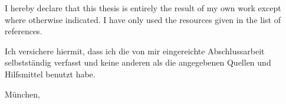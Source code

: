 I hereby declare that this thesis is entirely the result of my own work except where otherwise indicated. I have only used the resources given in the list of references.

Ich versichere hiermit, dass ich die von mir eingereichte Abschlussarbeit selbstständig verfasst und keine anderen als die angegebenen Quellen und Hilfsmittel benutzt habe.

\blank[3em]

München, \DateOfCompletion

\blank[2.5em]

\blackrule[width=12cm,height=0.2mm]
\hbox{\hbox{\small \Author}}

